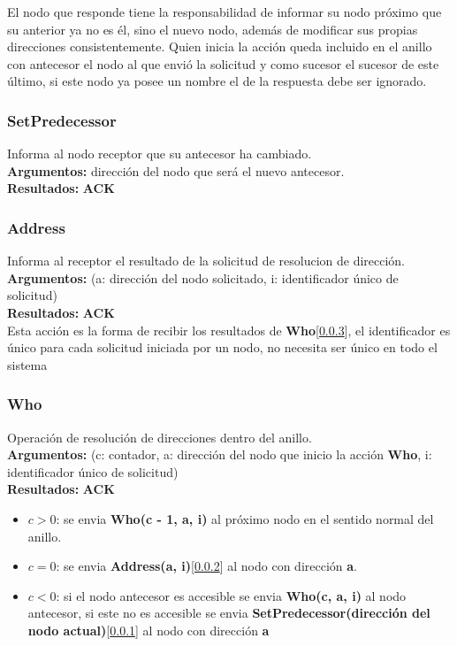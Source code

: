 \documentclass[a4paper,10pt]{article}
\begin{document}
			El nodo que responde tiene la responsabilidad de informar su nodo próximo que su anterior ya no es él, sino el nuevo nodo, además de modificar sus propias direcciones consistentemente.
			Quien inicia la acción queda incluido en el anillo con antecesor el nodo al que envió la solicitud y como sucesor el sucesor de este último, si este nodo ya posee un nombre el de la respuesta debe ser ignorado.
			
		\subsubsection{SetPredecessor}\label{setpre}
			Informa al nodo receptor que su antecesor ha cambiado.
			\\
			\textbf{Argumentos:} dirección del nodo que será el nuevo antecesor. \\
			\textbf{Resultados:} \textbf{ACK}\\
			
		\subsubsection{Address}\label{addr}
			Informa al receptor el resultado de la solicitud de resolucion de dirección.
			\\
			\textbf{Argumentos:} (a: dirección del nodo solicitado, i: identificador único de solicitud)\\
			\textbf{Resultados:} \textbf{ACK}\\
			Esta acción es la forma de recibir los resultados de \textbf{Who}[\ref{who}], el identificador es único para cada solicitud iniciada por un nodo, no necesita ser único en todo el sistema
		
		\subsubsection{Who}\label{who}
			Operación de resolución de direcciones dentro del anillo.
			\\
			\textbf{Argumentos:} (c: contador, a: dirección del nodo que inicio la acción \textbf{Who}, i: identificador único de solicitud)\\
			 \textbf{Resultados:} \textbf{ACK}\\
			
			\begin{itemize}
				\item $c > 0$: se envia \textbf{Who(c - 1, a, i)} al próximo nodo en el sentido normal del anillo.
				\item $c = 0$: se envia \textbf{Address(a, i)}[\ref{addr}] al nodo con dirección \textbf{a}.
				\item $c < 0$: si el nodo antecesor es accesible se envia \textbf{Who(c, a, i)} al nodo antecesor, si este no es accesible se envia \textbf{SetPredecessor(dirección del nodo actual)}[\ref{setpre}] al nodo con dirección \textbf{a}
			\end{itemize}
			
\end{document}
